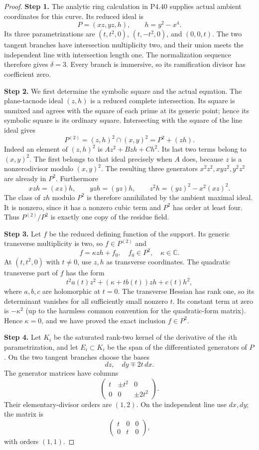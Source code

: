 \begin{proof}
\noindent\textbf{Step 1.} The analytic ring calculation in P4.40 supplies actual ambient
coordinates for this curve. Its reduced ideal is
\[
 P=(xz,yz,h),\qquad h=y^2-x^4.
\]
Its three parametrizations are $(t,t^2,0)$, $(t,-t^2,0)$,
and $(0,0,t)$. The two tangent branches have intersection
multiplicity two, and their union meets the independent line
with intersection length one. The normalization sequence
therefore gives $\delta=3$. Every branch is immersive, so
its ramification divisor has coefficient zero.

\noindent\textbf{Step 2.} We first determine the symbolic square and the actual
equation. The plane-tacnode ideal $(z,h)$ is a reduced
complete intersection. Its square is unmixed and agrees
with the square of each prime at its generic point; hence
its symbolic square is its ordinary square. Intersecting
with the square of the line ideal gives
\[
 P^{(2)}=(z,h)^2\cap(x,y)^2=P^2+(zh).
\]
Indeed an element of $(z,h)^2$ is $Az^2+Bzh+Ch^2$.
Its last two terms belong to $(x,y)^2$. The first belongs
to that ideal precisely when $A$ does, because $z$ is a
nonzerodivisor modulo $(x,y)^2$. The resulting three
generators $x^2z^2,xyz^2,y^2z^2$ are already in $P^2$.
Furthermore
\[
 xzh=(xz)h,\qquad yzh=(yz)h,\qquad
 z^2h=(yz)^2-x^2(xz)^2.
\]
The class of $zh$ modulo $P^2$ is therefore annihilated
by the ambient maximal ideal. It is nonzero, since it has
a nonzero cubic term and $P^2$ has order at least four.
Thus $P^{(2)}/P^2$ is exactly one copy of the residue field.

\noindent\textbf{Step 3.} Let $f$ be the reduced defining function of the support.
Its generic transverse multiplicity is two, so
$f\in P^{(2)}$ and
\[
                       f=\kappa zh+f_0,\quad f_0\in P^2,
                       \quad\kappa\in\mathbb C.
\]
At $(t,t^2,0)$ with $t\ne0$, use $z,h$ as transverse
coordinates. The quadratic transverse part of $f$ has the
form
\[
 t^2a(t)z^2+(\kappa+t b(t))zh+c(t)h^2,
\]
where $a,b,c$ are holomorphic at $t=0$. The transverse
Hessian has rank one, so its determinant vanishes for
all sufficiently small nonzero $t$. Its constant term at
zero is $-\kappa^2$ (up to the harmless common convention
for the quadratic-form matrix). Hence $\kappa=0$, and
we have proved the exact inclusion $f\in P^2$.

\noindent\textbf{Step 4.} Let $K_i$ be the saturated rank-two kernel of the derivative
of the $i$th parametrization, and let $E_i\subset K_i$ be
the span of the differentiated generators of $P$. On the
two tangent branches choose the bases
\[
                dz,\quad dy\mp2t\,dx.
\]
The generator matrices have columns
\[
 \begin{pmatrix}t&\pm t^2&0\\0&0&\pm2t^2\end{pmatrix}.
\]
Their elementary-divisor orders are $(1,2)$. On the
independent line use $dx,dy$; the matrix is
\[
                   \begin{pmatrix}t&0&0\\0&t&0\end{pmatrix},
\]
with orders $(1,1)$.


\end{proof}
